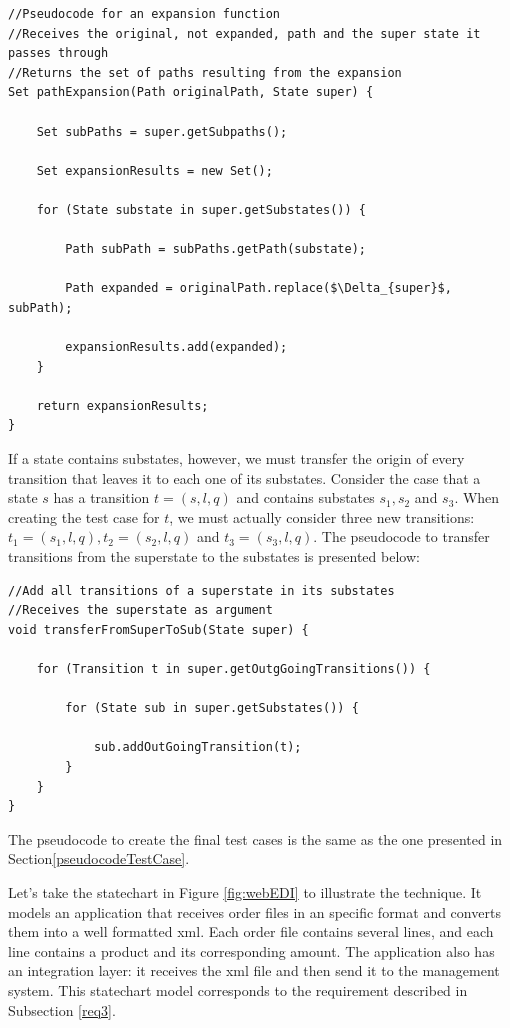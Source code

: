 \begin{lstlisting}[mathescape,caption={Expansion psseudocode for a path that passes through a superstate}]
//Pseudocode for an expansion function
//Receives the original, not expanded, path and the super state it passes through
//Returns the set of paths resulting from the expansion
Set pathExpansion(Path originalPath, State super) {
		
	Set subPaths = super.getSubpaths();

	Set expansionResults = new Set();

	for (State substate in super.getSubstates()) {
		
		Path subPath = subPaths.getPath(substate);

		Path expanded = originalPath.replace($\Delta_{super}$, subPath);

		expansionResults.add(expanded);
	}

	return expansionResults;
}

\end{lstlisting}

If a state contains substates, however, we must transfer the origin of every transition that leaves it to each one of its substates. Consider the case that a state $s$ has a transition $t = (s,l,q)$ and contains substates $s_1, s_2$ and $s_3$. When creating the test case for $t$, we must actually consider three new transitions: $t_1 = (s_1,l,q), t_2 = (s_2,l,q)$ and $t_3 = (s_3,l,q)$. The pseudocode to transfer transitions from the superstate to the substates is presented below:

\begin{lstlisting}[caption={Pseudocode to transfer transitions from a superstate to its substates}]
//Add all transitions of a superstate in its substates
//Receives the superstate as argument
void transferFromSuperToSub(State super) {
	
	for (Transition t in super.getOutgGoingTransitions()) {
		
		for (State sub in super.getSubstates()) {
			
			sub.addOutGoingTransition(t);
		}
	}
}

\end{lstlisting}

The pseudocode to create the final test cases is the same as the one presented in Section\ref{pseudocodeTestCase}.

Let's take the statechart in Figure \ref{fig:webEDI} to illustrate the technique. It models an application that receives order files in an specific format and converts them into a well formatted xml. Each order file contains several lines, and each line contains a product and its corresponding amount. The application also has an integration layer: it receives the xml file and then send it to the management system. This statechart model corresponds to the requirement described in Subsection \ref{req3}.

